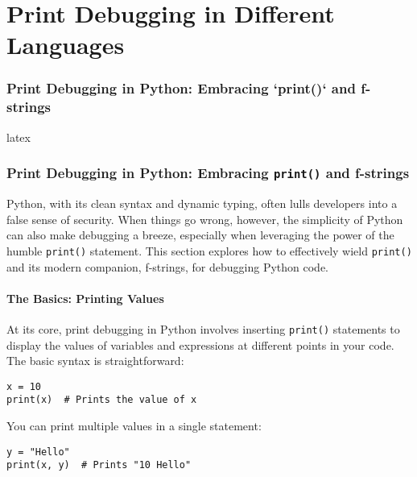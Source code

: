 \documentclass{article}
\begin{document}
{{{{\part*{Print Debugging in Different Languages} %
\label{part-9-Print_Debugging_in_Different_Languages}


\section*{Print Debugging in Python: Embracing `print()` and f-strings} %
\label{chapter-9-1-Print_Debugging_in_Python__Embracing__pr}

latex
\section*{Print Debugging in Python: Embracing \texttt{print()} and f-strings}

Python, with its clean syntax and dynamic typing, often lulls developers into a false sense of security. When things go wrong, however, the simplicity of Python can also make debugging a breeze, especially when leveraging the power of the humble \texttt{print()} statement. This section explores how to effectively wield \texttt{print()} and its modern companion, f-strings, for debugging Python code.

\subsection*{The Basics: Printing Values}

At its core, print debugging in Python involves inserting \texttt{print()} statements to display the values of variables and expressions at different points in your code. The basic syntax is straightforward:

\begin{verbatim}
x = 10
print(x)  # Prints the value of x
\end{verbatim}

You can print multiple values in a single statement:

\begin{verbatim}
y = "Hello"
print(x, y)  # Prints "10 Hello"
\end{verbatim}

}}}}
\end{document}
